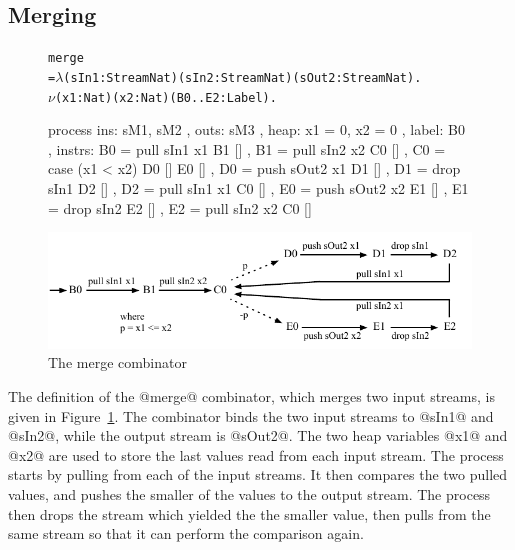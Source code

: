 \subsection{Merging}
\begin{figure}
\begin{alltt}
       merge
         = \(\lambda\) (sIn1: Stream Nat) (sIn2: Stream Nat) (sOut2: Stream Nat). 
           \(\nu\) (x1: Nat) (x2: Nat) (B0..E2: Label).
\end{alltt}
\begin{code}
           process
            { ins:    { sM1, sM2 }
            , outs:   { sM3 }
            , heap:   { x1 = 0, x2 = 0 }
            , label:  B0
            , instrs: { B0 = pull sIn1  x1   B1 []             , B1 = pull sIn2  x2   C0 []
                      , C0 = case (x1 < x2)  D0 []  E0 []      , D0 = push sOut2 x1   D1 []
                      , D1 = drop sIn1       D2 []             , D2 = pull sIn1  x1   C0 []
                      , E0 = push sOut2 x2   E1 []             , E1 = drop sIn2       E2 []
                      , E2 = pull sIn2 x2    C0 [] } }
\end{code}
\includegraphics[scale=1.0]{figures/state-merge.pdf}

\caption{The merge combinator}
\label{fig:Process:Merge}
\end{figure}

The definition of the @merge@ combinator, which merges two input streams, is given in Figure~\ref{fig:Process:Merge}. The combinator binds the two input streams to @sIn1@ and @sIn2@, while the output stream is @sOut2@. The two heap variables @x1@ and @x2@ are used to store the last values read from each input stream. The process starts by pulling from each of the input streams. It then compares the two pulled values, and pushes the smaller of the values to the output stream. The process then drops the stream which yielded the the smaller value, then pulls from the same stream so that it can perform the comparison again.

